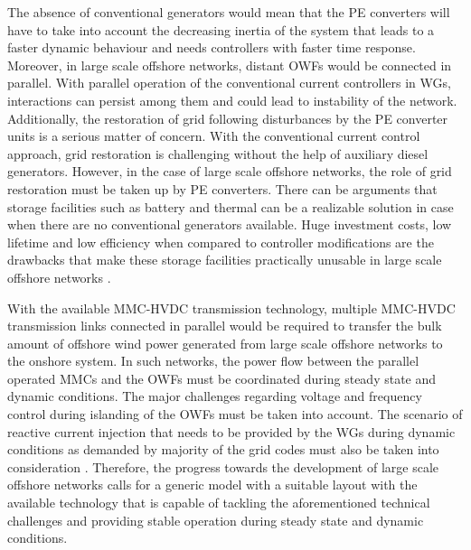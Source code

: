 The absence of conventional generators would mean that the \gls{PE} converters will have to take into account the decreasing inertia of the system that leads to a faster dynamic behaviour and needs controllers with faster time response. Moreover, in large scale offshore networks, distant \gls{OWF}s would be connected in parallel. With parallel operation of the conventional current controllers in \gls{WG}s, interactions can persist among them and could lead to instability of the network. Additionally, the restoration of grid following disturbances by the \gls{PE} converter units is a serious matter of concern. With the conventional current control approach, grid restoration is challenging without the help of auxiliary diesel generators. However, in the case of large scale offshore networks, the role of grid restoration must be taken up by \gls{PE} converters. There can be arguments that storage facilities such as battery and thermal can be a realizable solution in case when there are no conventional generators available. Huge investment costs, low lifetime and low efficiency when compared to controller modifications are the drawbacks that make these storage facilities practically unusable in large scale offshore networks \cite{telaretti_economic_2016}.

With the available \gls{MMC}-\gls{HVDC} transmission technology, multiple \gls{MMC}-\gls{HVDC} transmission links connected in parallel would be required to transfer the bulk amount of offshore wind power generated from large scale offshore networks to the onshore system. In such networks, the power flow between the parallel operated \gls{MMC}s and the \gls{OWF}s must be coordinated during steady state and dynamic conditions. The major challenges regarding voltage and frequency control during islanding of the \gls{OWF}s must be taken into account. The scenario of reactive current injection that needs to be provided by the \gls{WG}s during dynamic conditions as demanded by majority of the grid codes must also be taken into consideration \cite{mohseni_review_2012}. Therefore, the progress towards the development of large scale offshore networks calls for a generic model with a suitable layout with the available technology that is capable of tackling the aforementioned technical challenges and providing stable operation during steady state and dynamic conditions. 


